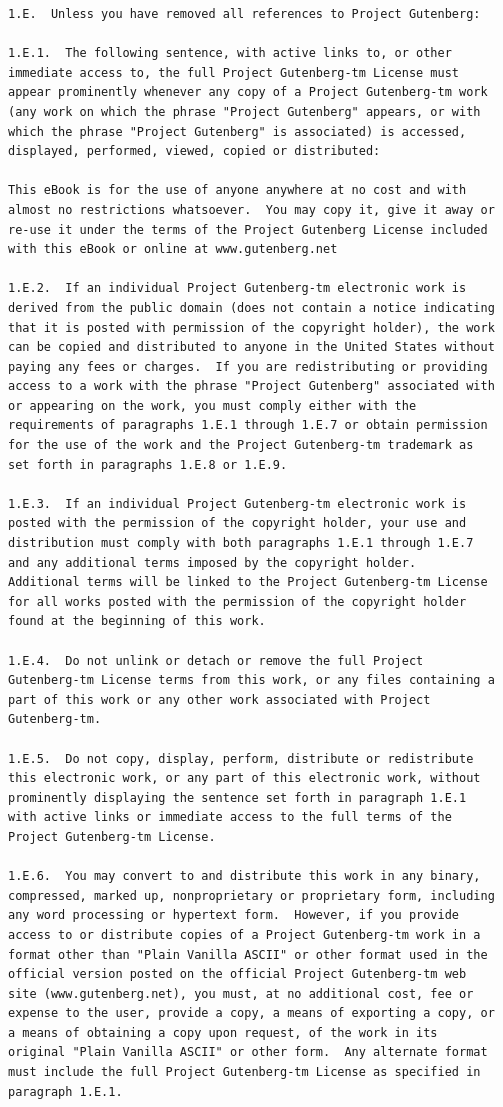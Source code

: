\documentclass{book}[2004/02/16]
\begin{document}
\begin{verbatim}
1.E.  Unless you have removed all references to Project Gutenberg:

1.E.1.  The following sentence, with active links to, or other
immediate access to, the full Project Gutenberg-tm License must
appear prominently whenever any copy of a Project Gutenberg-tm work
(any work on which the phrase "Project Gutenberg" appears, or with
which the phrase "Project Gutenberg" is associated) is accessed,
displayed, performed, viewed, copied or distributed:

This eBook is for the use of anyone anywhere at no cost and with
almost no restrictions whatsoever.  You may copy it, give it away or
re-use it under the terms of the Project Gutenberg License included
with this eBook or online at www.gutenberg.net

1.E.2.  If an individual Project Gutenberg-tm electronic work is
derived from the public domain (does not contain a notice indicating
that it is posted with permission of the copyright holder), the work
can be copied and distributed to anyone in the United States without
paying any fees or charges.  If you are redistributing or providing
access to a work with the phrase "Project Gutenberg" associated with
or appearing on the work, you must comply either with the
requirements of paragraphs 1.E.1 through 1.E.7 or obtain permission
for the use of the work and the Project Gutenberg-tm trademark as
set forth in paragraphs 1.E.8 or 1.E.9.

1.E.3.  If an individual Project Gutenberg-tm electronic work is
posted with the permission of the copyright holder, your use and
distribution must comply with both paragraphs 1.E.1 through 1.E.7
and any additional terms imposed by the copyright holder.
Additional terms will be linked to the Project Gutenberg-tm License
for all works posted with the permission of the copyright holder
found at the beginning of this work.

1.E.4.  Do not unlink or detach or remove the full Project
Gutenberg-tm License terms from this work, or any files containing a
part of this work or any other work associated with Project
Gutenberg-tm.

1.E.5.  Do not copy, display, perform, distribute or redistribute
this electronic work, or any part of this electronic work, without
prominently displaying the sentence set forth in paragraph 1.E.1
with active links or immediate access to the full terms of the
Project Gutenberg-tm License.

1.E.6.  You may convert to and distribute this work in any binary,
compressed, marked up, nonproprietary or proprietary form, including
any word processing or hypertext form.  However, if you provide
access to or distribute copies of a Project Gutenberg-tm work in a
format other than "Plain Vanilla ASCII" or other format used in the
official version posted on the official Project Gutenberg-tm web
site (www.gutenberg.net), you must, at no additional cost, fee or
expense to the user, provide a copy, a means of exporting a copy, or
a means of obtaining a copy upon request, of the work in its
original "Plain Vanilla ASCII" or other form.  Any alternate format
must include the full Project Gutenberg-tm License as specified in
paragraph 1.E.1.


\end{verbatim}
\end{document}
